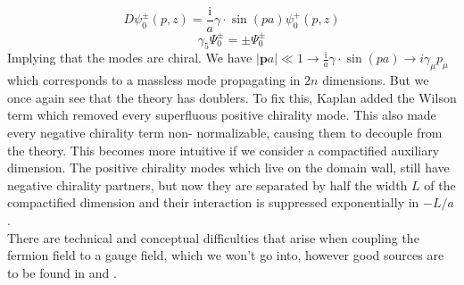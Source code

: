 \documentclass[a4paper,10pt]{article}
\begin{document}
\begin{equation}
D\psi_{0}^{\pm}(p, z)=\frac{\mathrm{i}}{a} \gamma \cdot \sin (p a)\psi_{0}^{+}(p, z)
\end{equation}
\begin{equation}
\gamma_{5} \Psi_{0}^{\pm}=\pm \Psi_{0}^{\pm}
\end{equation}
Implying that the modes are chiral.
We have $|\mathbf{p}a|\ll 1 \longrightarrow \frac{\mathrm{i}}{a} \gamma \cdot \sin (p a)\rightarrow i\gamma_\mu p_\mu$ which corresponds to a massless mode propagating in $2n$ dimensions. But we once again see that the theory has doublers. To fix this, Kaplan added the Wilson term which removed every superfluous positive chirality mode. This also made every negative chirality term non- normalizable, causing them to decouple from the theory. This becomes more intuitive if we consider a compactified auxiliary dimension. The positive chirality modes which live on the domain wall, still have negative chirality partners, but now they are separated by half the width $L$ of the compactified dimension and their interaction is suppressed exponentially in $-L/a$.\\There are technical and conceptual difficulties that arise when coupling the fermion field to a gauge field, which we won't go into, however good sources are to be found in \cite{KaplanDavidB1992Amfs} and \cite{TONG_LN}.
\end{document}
